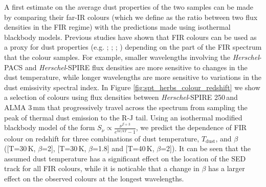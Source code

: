 A first estimate on the average dust properties of the two samples can be made by comparing their far-IR colours (which we define as the ratio between two flux densities in the FIR regime) with the predictions made using isothermal blackbody models. Previous studies have shown that FIR colours can be used as a proxy for dust properties (e.g. \citealt{Boselli_2010}; \citealt{Boselli_2012}; \citealt{Remy-Ruyer_2013}; \citealt{Smith_2019}) depending on the part of the FIR spectrum that the colour samples. For example, smaller wavelengths involving the \textit{Herschel}-PACS and \textit{Herschel}-SPIRE flux densities are more sensitive to changes in the dust temperature, while longer wavelengths are more sensitive to variations in the dust emissivity spectral index. In Figure \ref{fig:spt_herbs_colour_redshift} we show a selection of colours using flux densities between \textit{Herschel}-SPIRE 250\,\micron and ALMA 3\,mm that progressively travel across the spectrum from sampling the peak of thermal dust emission to the R-J tail. Using an isothermal modified blackbody model of the form $S_\nu \propto \frac{\nu^{\beta+3}}{e^{h \nu/kT} - 1}$, we predict the dependence of FIR colour on redshift for three combinations of dust temperature, $T_{\textrm{dust}}$, and $\beta$ ([T=30\,K, $\beta$=2], [T=30\,K, $\beta$=1.8] and [T=40\,K, $\beta$=2]). It can be seen that the assumed dust temperature has a significant effect on the location of the SED track for all FIR colours, while it is noticable that a change in $\beta$ has a larger effect on the observed colours at the longest wavelengths. 

